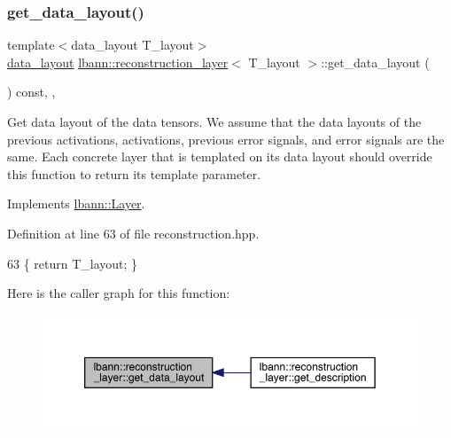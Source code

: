 \subsubsection{\texorpdfstring{get\+\_\+data\+\_\+layout()}{get\_data\_layout()}}
{\footnotesize\ttfamily template$<$data\+\_\+layout T\+\_\+layout$>$ \\
\hyperlink{base_8hpp_a786677cbfb3f5677b4d84f3056eb08db}{data\+\_\+layout} \hyperlink{classlbann_1_1reconstruction__layer}{lbann\+::reconstruction\+\_\+layer}$<$ T\+\_\+layout $>$\+::get\+\_\+data\+\_\+layout (\begin{DoxyParamCaption}{ }\end{DoxyParamCaption}) const\hspace{0.3cm}{\ttfamily [inline]}, {\ttfamily [override]}, {\ttfamily [virtual]}}

Get data layout of the data tensors. We assume that the data layouts of the previous activations, activations, previous error signals, and error signals are the same. Each concrete layer that is templated on its data layout should override this function to return its template parameter. 

Implements \hyperlink{classlbann_1_1Layer_a5dfb66e81fc085997402a5e2241316bd}{lbann\+::\+Layer}.



Definition at line 63 of file reconstruction.\+hpp.


\begin{DoxyCode}
63 \{ \textcolor{keywordflow}{return} T\_layout; \}
\end{DoxyCode}
Here is the caller graph for this function\+:\nopagebreak
\begin{figure}[H]
\begin{center}
\leavevmode
\includegraphics[width=350pt]{classlbann_1_1reconstruction__layer_a7516698ae3de4cea311ec17685a0b60a_icgraph}
\end{center}
\end{figure}
\mbox{\label{classlbann_1_1reconstruction__layer_a738c3f06ea3cee1e8b11672fde6b594e}} 
